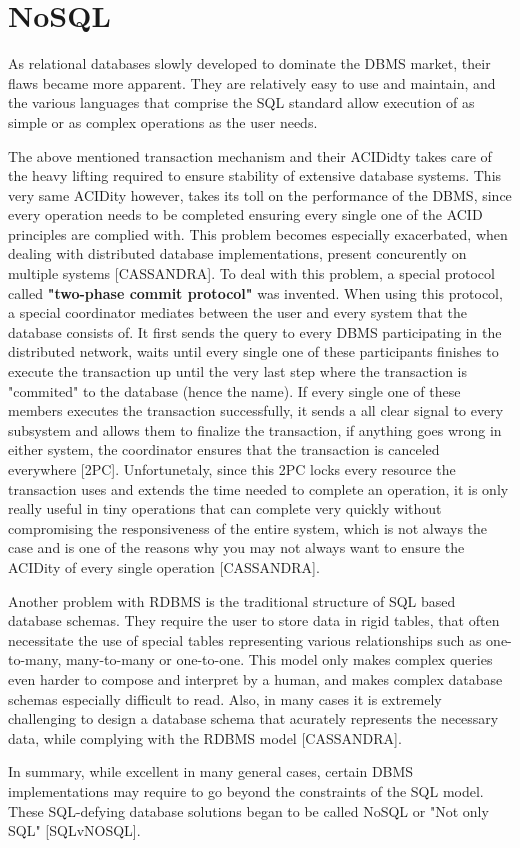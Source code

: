 \section{NoSQL}
\label{sec:background:second_section}
\par As relational databases slowly developed to dominate the DBMS market, their flaws became more apparent. They are relatively easy to use and maintain, and the various languages that comprise the SQL standard allow execution of as simple or as complex operations as the user needs. 
\par The above mentioned transaction mechanism and their ACIDidty takes care of the heavy lifting required to ensure stability of extensive database systems. This very same ACIDity however, takes its toll on the performance of the DBMS, since every operation needs to be completed ensuring every single one of the ACID principles are complied with. This problem becomes especially exacerbated, when dealing with distributed database implementations, present concurently on multiple systems [CASSANDRA]. To deal with this problem, a special protocol called \textbf{"two-phase commit protocol"} was invented. When using this protocol, a special coordinator mediates between the user and every system that the database consists of. It first sends the query to every DBMS participating in the distributed network, waits until every single one of these participants finishes to execute the transaction up until the very last step where the transaction is "commited" to the database (hence the name). If every single one of these members executes the transaction successfully, it sends a all clear signal to every subsystem and allows them to finalize the transaction, if anything goes wrong in either system, the coordinator ensures that the transaction is canceled everywhere [2PC]. Unfortunetaly, since this 2PC locks every resource the transaction uses and extends the time needed to complete an operation, it is only really useful in tiny operations that can complete very quickly without compromising the responsiveness of the entire system, which is not always the case and is one of the reasons why you may not always want to ensure the ACIDity of every single operation [CASSANDRA].
\par Another problem with RDBMS is the traditional structure of SQL based database schemas. They require the user to store data in rigid tables, that often necessitate the use of special tables representing various relationships such as one-to-many, many-to-many or one-to-one. This model only makes complex queries even harder to compose and interpret by a human, and makes complex database schemas especially difficult to read. Also, in many cases it is extremely challenging to design a database schema that acurately represents the necessary data, while complying with the RDBMS model [CASSANDRA].
\par In summary, while excellent in many general cases, certain DBMS implementations may require to go beyond the constraints of the SQL model. These SQL-defying database solutions began to be called NoSQL or "Not only SQL" [SQLvNOSQL].

